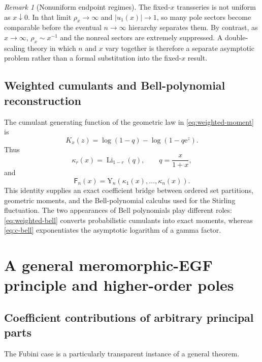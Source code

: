 \documentclass[11pt,a4paper,oneside]{article}
\theoremstyle{definition}
\theoremstyle{remark}
\newtheorem{remark}[theorem]{Remark}
\newcommand{\Fub}{\mathsf{F}}
\newcommand{\Li}{\operatorname{Li}}
\newcommand{\e}{\mathrm{e}}
\newcommand{\BellY}{\mathrm{Y}}
\begin{document}
\begin{remark}[Nonuniform endpoint regimes]
The fixed-$x$ transseries is not uniform as $x\downarrow0$.  In that limit
$\rho_x\to\infty$ and
$|u_1(x)|\to1$, so many pole sectors become comparable before the eventual
$n\to\infty$ hierarchy separates them.  By contrast, as $x\to\infty$,
$\rho_x\sim x^{-1}$ and the nonreal sectors are extremely suppressed.  A
double-scaling theory in which $n$ and $x$ vary together is therefore a
separate asymptotic problem rather than a formal substitution into the
fixed-$x$ result.
\end{remark}

\subsection{Weighted cumulants and Bell-polynomial reconstruction}
The cumulant generating function of the geometric law in
\cref{eq:weighted-moment} is
\[
 K_x(z)=\log(1-q)-\log(1-q\e^z).
\]
Thus
\begin{equation}\label{eq:weighted-cumulants}
 \kappa_r(x)=\Li_{1-r}(q),
 \qquad q=\frac{x}{1+x},
\end{equation}
and
\begin{equation}\label{eq:weighted-bell}
 \Fub_n(x)=\BellY_n(\kappa_1(x),\ldots,\kappa_n(x)).
\end{equation}
This identity supplies an exact coefficient bridge between ordered set
partitions, geometric moments, and the Bell-polynomial calculus used for the
Stirling fluctuation.  The two appearances of Bell polynomials play different
roles: \cref{eq:weighted-bell} converts probabilistic cumulants into exact
moments, whereas \cref{eq:c-bell} exponentiates the asymptotic logarithm of a
gamma factor.


\section{A general meromorphic-EGF principle and higher-order poles}
\label{sec:meromorphic}

\subsection{Coefficient contributions of arbitrary principal parts}
The Fubini case is a particularly transparent instance of a general theorem.
\end{document}
